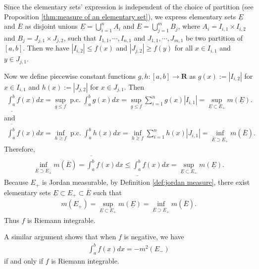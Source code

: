\documentclass{book}
\theoremstyle{defstyle}
\theoremstyle{thmstyle}
\DeclareMathOperator{\PiecewiseConstant}{p.c.}
\newcommand{\pcint}{\PiecewiseConstant\int}
\newcounter{Proposition}[section]
\begin{document}
Since the elementary sets' expression is independent of the choice of partition (see Proposition \ref{thm:measure of an elementary set}), we express elementary sets $\underline{E}$ and $\overline{E}$ as disjoint unions $\underline{E} = \bigcup_{i = 1}^{n}A_i$ and $\overline{E} = \bigcup_{j = 1}^{m}B_j$, where $A_i = I_{i, 1} \times I_{i, 2}$ and $B_j = J_{j, 1} \times J_{j, 2}$, such that $I_{1, 1}, \cdots, I_{n, 1}$ and $J_{1, 1}, \cdots, J_{m, 1}$ be two partition of $[a, b]$. Then we have $|I_{i, 2}| \leq f(x)$ and $|J_{j, 2}| \geq f(y)$ for all $x \in I_{i, 1}$ and $y \in J_{j, 1}$.

Now we define piecewise constant functions $g,h : [a, b] \to \mathbf{R}$ as $g(x) := |I_{i, 2}|$ for $x \in I_{i, 1}$ and $h(x) := |J_{j, 2}|$ for $x \in J_{j, 1}$. Then
    \begin{align*}
        \underline{\int_{a}^{b}}f(x)dx
        = \sup_{g \leq f}\pcint_{a}^{b}g(x)dx
        = \sup_{g \leq f}\sum_{i = 1}^{n}g(x)|I_{i, 1}|
        = \sup_{\underline{E} \subset E_+}m(\underline{E}).
    \end{align*}
and
    \begin{align*}
        \overline{\int_{a}^{b}}f(x)dx
        = \inf_{h \geq f}\pcint_{a}^{b}h(x)dx
        = \inf_{h \geq f}\sum_{i = 1}^{n}h(x)|J_{i, 1}|
        = \inf_{\overline{E} \supset E_+}m(\overline{E}).
    \end{align*}
Therefore,
    \begin{align*}
        \inf_{\overline{E} \supset E_+}m(\overline{E})
        = \overline{\int_{a}^{b}}f(x)dx
        \leq \underline{\int_{a}^{b}}f(x)dx
        = \sup_{\underline{E} \subset E_+}m(\underline{E}).
    \end{align*}
Because $E_+$ is Jordan measurable, by Definition \ref{def:jordan measure}, there exist elementary sets $\underline{E} \subset E_+ \subset \overline{E}$ such that
    \begin{align*}
        m(E_+)
        = \sup_{\underline{E} \subset E_+}m(\underline{E})
        = \inf_{\overline{E} \supset E_+}m(\overline{E}).
    \end{align*}
Thus $f$ is Riemann integrable.

A similar argument shows that when $f$ is negative, we have
    \begin{align*}
        \int_{a}^{b}f(x)dx = -m^2(E_-)
    \end{align*}
if and only if $f$ is Riemann integrable.
\end{document}
